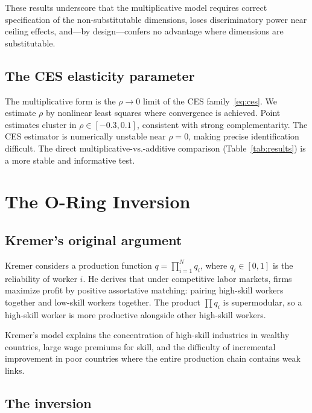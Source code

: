 \documentclass[12pt, a4paper]{article}
\theoremstyle{definition}
\theoremstyle{remark}
\begin{document}
These results underscore that the multiplicative model requires correct specification of the non-substitutable dimensions, loses discriminatory power near ceiling effects, and---by design---confers no advantage where dimensions are substitutable.

\subsection{The CES elasticity parameter}\label{sec:ces}

The multiplicative form is the $\rho \to 0$ limit of the CES family~\eqref{eq:ces}. We estimate $\rho$ by nonlinear least squares where convergence is achieved. Point estimates cluster in $\rho \in [-0.3, 0.1]$, consistent with strong complementarity. The CES estimator is numerically unstable near $\rho = 0$, making precise identification difficult. The direct multiplicative-vs.-additive comparison (Table~\ref{tab:results}) is a more stable and informative test.


\section{The O-Ring Inversion}\label{sec:oring}

\subsection{Kremer's original argument}

Kremer \cite{kremer1993} considers a production function $q = \prod_{i=1}^{N} q_i$, where $q_i \in [0, 1]$ is the reliability of worker $i$. He derives that under competitive labor markets, firms maximize profit by positive assortative matching: pairing high-skill workers together and low-skill workers together. The product $\prod q_i$ is supermodular, so a high-skill worker is more productive alongside other high-skill workers.

Kremer's model explains the concentration of high-skill industries in wealthy countries, large wage premiums for skill, and the difficulty of incremental improvement in poor countries where the entire production chain contains weak links.

\subsection{The inversion}
\end{document}
